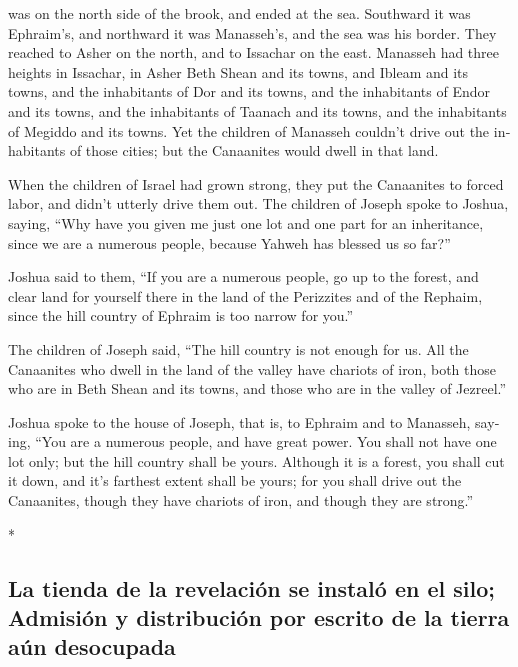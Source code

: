 \begin{paracol}{2}
\begin{otherlanguage}{english}
was on the north side of the brook, and ended at the sea.
 Southward it was Ephraim's, and northward it was
Manasseh's, and the sea was his border. They reached to Asher on the
north, and to Issachar on the east.  Manasseh had three
heights in Issachar, in Asher Beth Shean and its towns, and Ibleam and
its towns, and the inhabitants of Dor and its towns, and the inhabitants
of Endor and its towns, and the inhabitants of Taanach and its towns,
and the inhabitants of Megiddo and its towns.  Yet the
children of Manasseh couldn't drive out the inhabitants of those cities;
but the Canaanites would dwell in that land.

 When the children of Israel had grown strong, they put
the Canaanites to forced labor, and didn't utterly drive them out.
 The children of Joseph spoke to Joshua, saying, ``Why
have you given me just one lot and one part for an inheritance, since we
are a numerous people, because Yahweh has blessed us so far?''

 Joshua said to them, ``If you are a numerous people, go
up to the forest, and clear land for yourself there in the land of the
Perizzites and of the Rephaim, since the hill country of Ephraim is too
narrow for you.''

 The children of Joseph said, ``The hill country is not
enough for us. All the Canaanites who dwell in the land of the valley
have chariots of iron, both those who are in Beth Shean and its towns,
and those who are in the valley of Jezreel.''

 Joshua spoke to the house of Joseph, that is, to Ephraim
and to Manasseh, saying, ``You are a numerous people, and have great
power. You shall not have one lot only;  but the hill
country shall be yours. Although it is a forest, you shall cut it down,
and it's farthest extent shall be yours; for you shall drive out the
Canaanites, though they have chariots of iron, and though they are
strong.''

\end{otherlanguage}

\switchcolumn[0]*

\hypertarget{la-tienda-de-la-revelaciuxf3n-se-instaluxf3-en-el-silo-admisiuxf3n-y-distribuciuxf3n-por-escrito-de-la-tierra-auxfan-desocupada}{%
\subsection{La tienda de la revelación se instaló en el silo; Admisión y
distribución por escrito de la tierra aún
desocupada}\label{la-tienda-de-la-revelaciuxf3n-se-instaluxf3-en-el-silo-admisiuxf3n-y-distribuciuxf3n-por-escrito-de-la-tierra-auxfan-desocupada}}


\end{paracol}
